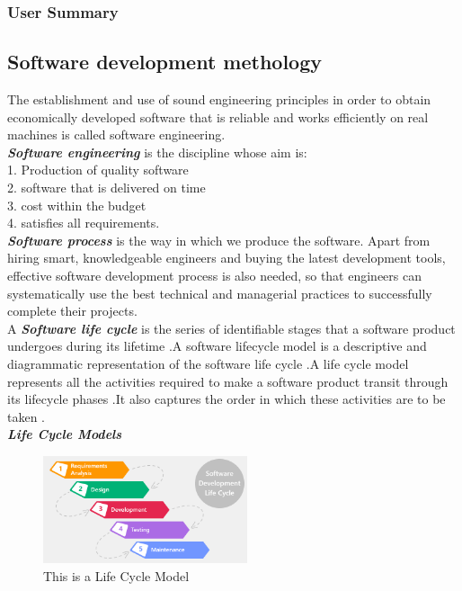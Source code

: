 \documentclass{scrartcl}
\begin{document}
  	
  	\subsubsection{User Summary}
  	
  	\subsection{Software development methology}
  	The establishment and use of sound engineering principles in order to obtain economically
developed software that is reliable and works efficiently on real machines is called software engineering.\\
\textbf{\textit{ Software engineering}} is the discipline whose aim is:\\
1. Production of quality software\\
2. software that is delivered on time\\
3. cost within the budget\\
4. satisfies all requirements.\\
\textbf{\textit{ Software process}} is the way in which we produce the software. Apart from hiring smart,
knowledgeable engineers and buying the latest development tools, effective software
development process is also needed, so that engineers can systematically use the best technical
and managerial practices to successfully complete their projects.\\
A \textbf{\textit{ Software life cycle}} is the series of identifiable stages that a software product undergoes during
its lifetime .A software lifecycle model is a descriptive and diagrammatic representation of the
software life cycle .A life cycle model represents all the activities required to make a software
product transit through its lifecycle phases .It also captures the order in which these activities are
to be taken .\\

\textbf{\textit{ Life Cycle Models}} \\[1cm]
\begin{figure}[h]
\centering
\includegraphics[width = 60mm]{lc.JPG}
\caption{This is a Life Cycle Model}
\label{Life Cucle Models}
\end{figure}
\end{document}
